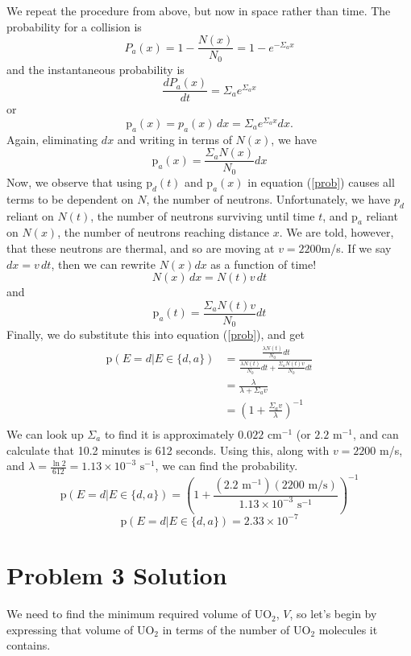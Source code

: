 \documentclass{report}
\begin{document}
We repeat the procedure from above, but now in space rather than time. The probability for a collision is
$$ P_a(x) = 1-\frac{N(x)}{N_0} = 1 - e^{-\Sigma_a x} $$
and the instantaneous probability is 
$$ \frac{dP_a(x)}{dt} = \Sigma_a e^{\Sigma_a x} $$
or 
$$ \text{p}_a(x) = p_a(x) \, dx = \Sigma_a e^{\Sigma_a x} dx .$$
Again, eliminating $dx$ and writing in terms of $N(x)$, we have
$$ \text{p}_a(x) = \frac{\Sigma_a N(x)}{N_0} dx $$
Now, we observe that using $\text{p}_d(t)$ and $\text{p}_a(x)$ in equation (\ref{prob}) causes all terms to be dependent on $N$, the number of neutrons. Unfortunately, we have $p_d$ reliant on $N(t)$, the number of neutrons surviving until time $t$, and $\text{p}_a$ reliant on $N(x)$, the number of neutrons reaching distance $x$. We are told, however, that these neutrons are thermal, and so are moving at $v = 2200$m/s. If we say $dx = v \, dt$, then we can rewrite $N(x) dx$ as a function of time! 
$$ N(x) \, dx = N(t) v \, dt $$
and
$$ \text{p}_a(t) = \frac{\Sigma_a N(t) v}{N_0} dt $$
Finally, we do substitute this into equation (\ref{prob}), and get
\begin{align*}
\text{p}(E=d | E \in \{d,a\})	&= \frac{\frac{\lambda N(t)}{N_0} dt}{\frac{\lambda N(t)}{N_0} dt + \frac{\Sigma_a N(t) v}{N_0} dt}\\
								&= \frac{\lambda}{\lambda + \Sigma_a v}\\
								&= \left(1 + \frac{\Sigma_a v}{\lambda}\right)^{-1}\\
\end{align*}
We can look up $\Sigma_a$ to find it is approximately $0.022\text{ cm}^{-1}$ (or $2.2\text{ m}^{-1}$, and can calculate that 10.2 minutes is 612 seconds.  Using this, along with $v = 2200$ m/s, and $\lambda = \frac{\ln 2}{612} = 1.13\times10^{-3}\text{ s}^{-1}$, we can find the probability.
$$ \text{p}(E=d | E \in \{d,a\}) = \left(1 + \frac{(2.2\text{ m}^{-1})(2200\text{ m/s})}{1.13\times10^{-3}\text{ s}^{-1}}\right)^{-1} $$
$$\boxed{ \text{p}(E=d | E \in \{d,a\}) = 2.33\times10^{-7} }$$



\newpage


\section*{Problem 3 Solution}


We need to find the minimum required volume of UO$_2$, $V$, so let's begin by expressing that volume of UO$_2$ in terms of the number of UO$_2$ molecules it contains. 
\end{document}

